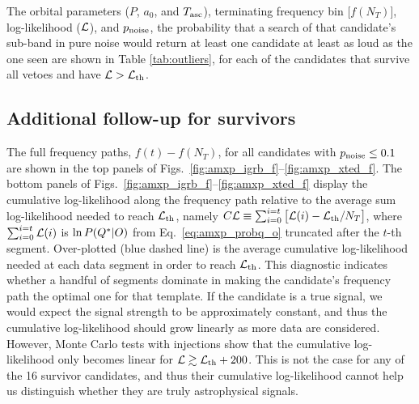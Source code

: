 \begin{subappendices}
The orbital parameters ($P$, $a_0$, and $T_{\textrm{asc}}$), terminating frequency bin [$f(N_T)$], log-likelihood ($\mathcal{L}$), and $p_{\rm noise}$, the probability that a search of that candidate's sub-band in pure noise would return at least one candidate at least as loud as the one seen are shown in Table \ref{tab:outliers}, for each of the candidates that survive all vetoes and have $\mathcal{L} > \mathcal{L}_{\rm th}$. 

\subsection{Additional follow-up for survivors \label{app:amxp_followup}}
The full frequency paths, $f(t) - f(N_T)$, for all candidates with $p_{\rm noise} \leq 0.1$ are shown in the top panels of Figs.~\ref{fig:amxp_igrb_f}--\ref{fig:amxp_xted_f}. The bottom panels of Figs.~\ref{fig:amxp_igrb_f}--\ref{fig:amxp_xted_f} display the cumulative log-likelihood along the frequency path relative to the average sum log-likelihood needed to reach $\mathcal{L}_{\rm th}$, namely $C\mathcal{L} \equiv \sum_{i=0}^{i=t}\big[\mathcal{L}(i) - \mathcal{L}_{\rm th} / N_T\big]$, where $\sum_{i=0}^{i=t}\mathcal{L}(i)$ is ${\rm ln\,} P(Q^*|O)$ from Eq.~\eqref{eq:amxp_probq_o} truncated after the $t$-th segment. Over-plotted (blue dashed line) is the average cumulative log-likelihood needed at each data segment in order to reach $\mathcal{L}_{\rm th}$. This diagnostic indicates whether a handful of segments dominate in making the candidate's frequency path the optimal one for that template. If the candidate is a true signal, we would expect the signal strength to be approximately constant, and thus the cumulative log-likelihood should grow linearly as more data are considered. However, Monte Carlo tests with injections show that the cumulative log-likelihood only becomes linear for $\mathcal{L} \gtrsim \mathcal{L}_{\rm th}+200$. This is not the case for any of the 16 survivor candidates, and thus their cumulative log-likelihood cannot help us distinguish whether they are truly astrophysical signals.


\end{subappendices}
